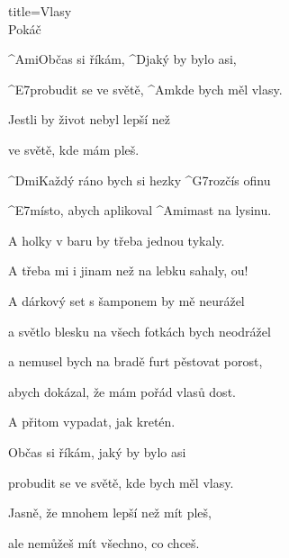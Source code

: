 \begin{song}{title=\predtitle\centering Vlasy\\\large Pokáč \vspace*{-0.3cm}}  %
\begin{centerjustified}

	^{Ami}Občas si říkám, ^{\z D}jaký by bylo asi,

	^{E7\z}probudit se ve světě, ^{Am}kde bych měl vlasy.

	Jestli by život nebyl lepší než

	ve světě, kde mám pleš.

\sloka
	^{Dmi\z}Každý ráno bych si hezky ^{G7\z}rozčís ofinu

	^{E7\z}místo, abych aplikoval ^{Ami\z}mast na lysinu.

	A holky v baru by třeba jednou tykaly.

	A třeba mi i jinam než na lebku sahaly, ou!

\sloka
	A dárkový set s šamponem by mě neurážel

	a světlo blesku na všech fotkách bych neodrážel

	a nemusel bych na bradě furt pěstovat porost,

	abych dokázal, že mám pořád vlasů dost.

	A přitom vypadat, jak kretén.

	Občas si říkám, jaký by bylo asi

	probudit se ve světě, kde bych měl vlasy.

	Jasně, že mnohem lepší než mít pleš,

	ale nemůžeš mít všechno, co chceš.

\end{centerjustified}
\setcounter{Slokočet}{0}
\end{song}
